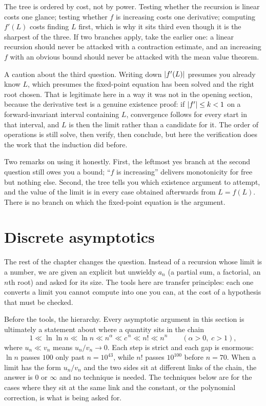 The tree is ordered by cost, not by power. Testing whether the recursion is linear costs one glance; testing whether $f$ is increasing costs one derivative; computing $f'(L)$ costs finding $L$ first, which is why it sits third even though it is the sharpest of the three. If two branches apply, take the earlier one: a linear recursion should never be attacked with a contraction estimate, and an increasing $f$ with an obvious bound should never be attacked with the mean value theorem.

A caution about the third question. Writing down $\left\lvert f'(L)\right\rvert$ presumes you already know $L$, which presumes the fixed-point equation has been solved and the right root chosen. That is legitimate here in a way it was not in the opening section, because the derivative test is a genuine existence proof: if $\left\lvert f'\right\rvert\leq k<1$ on a forward-invariant interval containing $L$, convergence follows for every start in that interval, and $L$ is then the limit rather than a candidate for it. The order of operations is still solve, then verify, then conclude, but here the verification does the work that the induction did before.

Two remarks on using it honestly. First, the leftmost yes branch at the second question still owes you a bound; ``$f$ is increasing'' delivers monotonicity for free but nothing else. Second, the tree tells you which existence argument to attempt, and the value of the limit is in every case obtained afterwards from $L=f(L)$. There is no branch on which the fixed-point equation is the argument.

\section{Discrete asymptotics}

The rest of the chapter changes the question. Instead of a recursion whose limit is a number, we are given an explicit but unwieldy $a_n$ (a partial sum, a factorial, an $n$th root) and asked for its size. The tools here are transfer principles: each one converts a limit you cannot compute into one you can, at the cost of a hypothesis that must be checked.

Before the tools, the hierarchy. Every asymptotic argument in this section is ultimately a statement about where a quantity sits in the chain
\[1\ll\ln\ln n\ll\ln n\ll n^{\alpha}\ll c^{\,n}\ll n!\ll n^{n}\qquad(\alpha>0,\;c>1),\]
where $u_n\ll v_n$ means $u_n/v_n\to0$. Each step is strict and each gap is enormous: $\ln n$ passes $100$ only past $n=10^{43}$, while $n!$ passes $10^{100}$ before $n=70$. When a limit has the form $u_n/v_n$ and the two sides sit at different links of the chain, the answer is $0$ or $\infty$ and no technique is needed. The techniques below are for the cases where they sit at the same link and the constant, or the polynomial correction, is what is being asked for.

